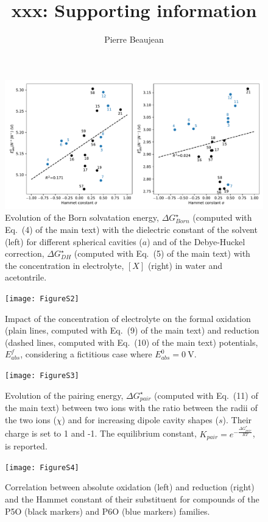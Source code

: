 \documentclass[11pt,a4paper]{article}
\title{xxx: Supporting information}
\author{Pierre Beaujean}
\begin{document}
\maketitle


\renewcommand{\thetable}{S\arabic{table}}
\renewcommand{\thefigure}{S\arabic{figure}}

\begin{figure}[!h]
	\centering
	\includegraphics [width=\linewidth]{FigureS1}
	\caption{Evolution of the Born solvatation energy, $\Delta G^\star_{Born}$ (computed with Eq.~(4) of the main text) with the dielectric constant of the solvent (left) for different spherical cavities ($a$) and of the Debye-Huckel correction, $\Delta G^\star_{DH}$  (computed with Eq.~(5) of the main text) with the concentration in electrolyte, $[X]$ (right) in water and acetontrile.}
\end{figure}

\begin{figure}[!h]
\centering
\texttt{[image: FigureS2]}
\caption{Impact of the concentration of electrolyte on the formal oxidation (plain lines, computed with Eq.~(9) of the main text) and reduction (dashed lines, computed with Eq.~(10) of the main text) potentials, $E^f_{abs}$, considering a fictitious case where $E^0_{abs} = \SI{0}{\volt}$.}
\end{figure}

\begin{figure}[!h]
\centering
\texttt{[image: FigureS3]}
\caption{Evolution of the pairing energy, $\Delta G^\star_{pair}$ (computed with Eq.~(11) of the main text) between two ions with the ratio between the radii of the two ions ($\chi$) and for increasing dipole cavity shapes ($s$). Their charge is set to 1 and -1. The equilibrium constant, $K_{pair} = e^{-\frac{\Delta G^\star_{pair}}{RT}}$, is reported.}
\end{figure}

\begin{figure}[!h]
	\centering
	\texttt{[image: FigureS4]}
	\caption{Correlation between absolute oxidation (left) and reduction (right) and the Hammet constant of their substituent for compounds of the P5O (black markers) and P6O (blue markers) families.}
\end{figure}
	
\end{document}
